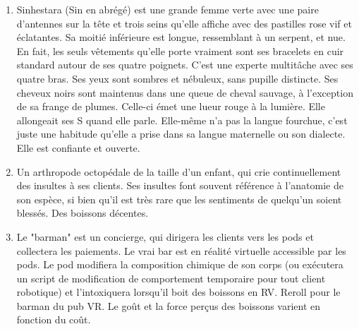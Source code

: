 \documentclass{article}
\begin{document}
\begin{enumerate}
	\item Sinhestara (Sin en abrégé) est une grande femme verte avec une paire d'antennes sur la tête et trois seins qu'elle affiche avec des pastilles rose vif et éclatantes. Sa moitié inférieure est longue, ressemblant à un serpent, et nue. En fait, les seuls vêtements qu'elle porte vraiment sont ses bracelets en cuir standard autour de ses quatre poignets. C'est une experte multitâche avec ses quatre bras. Ses yeux sont sombres et nébuleux, sans pupille distincte. Ses cheveux noirs sont maintenus dans une queue de cheval sauvage, à l'exception de sa frange de plumes. Celle-ci émet une lueur rouge à la lumière. Elle allongeait ses S quand elle parle. Elle-même n'a pas la langue fourchue, c'est juste une habitude qu'elle a prise dans sa langue maternelle ou son dialecte. Elle est confiante et ouverte.
	\item Un arthropode octopédale de la taille d'un enfant, qui crie continuellement des insultes à ses clients. Ses insultes font souvent référence à l'anatomie de son espèce, si bien qu'il est très rare que les sentiments de quelqu'un soient blessés. Des boissons décentes.
	\item Le "barman" est un concierge, qui dirigera les clients vers les pods et collectera les paiements. Le vrai bar est en réalité virtuelle accessible par les pods. Le pod modifiera la composition chimique de son corps (ou exécutera un script de modification de comportement temporaire pour tout client robotique) et l'intoxiquera lorsqu'il boit des boissons en RV. Reroll pour le barman du pub VR. Le goût et la force perçus des boissons varient en fonction du coût.

\end{enumerate}
\end{document}
